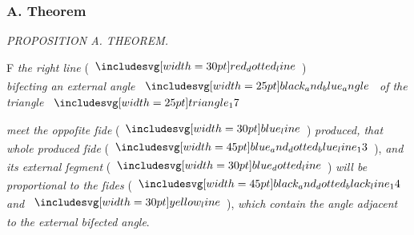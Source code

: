 \documentclass[11pt,preview]{standalone}
\begin{document}
\subsubsection{A. Theorem}

\begin{minipage}[t]{0.54\textwidth}
    \begin{center}
        \textit{PROPOSITION A. THEOREM.}\label{book6prA} \\
    \end{center}

    \hfill

    \begin{center}
        \raggedright \lettrine[lines=3, loversize=1, nindent=0pt]{}{}F \textit{the right line} (\hspace{-1ex}$\dottedredline$\hspace{-1ex})\\ \textit{biſecting an external angle} $\img{black_and_blue_angle}$ \textit{of the triangle} $\img{triangle_17}$
    \end{center}
    \raggedright \textit{meet the oppoſite ſide} (\hspace{-1ex}$\blueline$\hspace{-1ex}) \textit{produced, that whole produced ſide} (\hspace{-1ex}$\bimg{blue_and_dotted_blue_line_13}$\hspace{-1ex}), \textit{and its external ſegment} (\hspace{-1ex}$\dottedblueline$\hspace{-1ex}) \textit{will be proportional to the ſides} (\hspace{-1ex}$\bimg{black_and_dotted_black_line_14}$ \textit{and} $\yellowline$\hspace{-1ex}), \textit{which contain the angle adjacent to the external biſected angle}.
\end{minipage}%
\hfill
\begin{minipage}[t]{0.43\textwidth}
    \vspace{20pt}
    
\end{minipage}

\hfill
\end{document}
